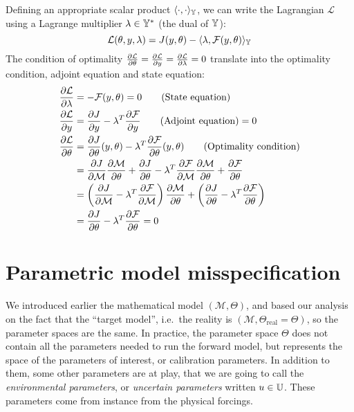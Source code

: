 \documentclass[../../Main_ManuscritThese.tex]{subfiles}
\begin{document}
Defining an appropriate scalar product $\langle \cdot, \cdot \rangle_{\mathbb{Y}}$, we can write the Lagrangian $\mathcal{L}$ using a Lagrange multiplier $\lambda \in \mathbb{Y}^*$ (the dual of $\mathbb{Y}$):
\begin{equation}
  \mathcal{L}(\theta, y, \lambda) = J(y,\theta) - \langle \lambda , \mathcal{F}(y, \theta)\rangle_{\mathbb{Y}}
\end{equation}
The condition of optimality $\frac{\partial \mathcal{L}}{\partial \theta} = \frac{\partial \mathcal{L}}{\partial y} = \frac{\partial \mathcal{L}}{\partial \lambda} = 0$ translate into the optimality condition, adjoint equation and state equation:
\begin{align}
  \frac{\partial \mathcal{L}}{\partial \lambda} &= - \mathcal{F}(y,\theta) = 0 \tag{State equation}\\
  \frac{\partial \mathcal{L}}{\partial y} &= \frac{\partial J}{\partial y} - \lambda^T \frac{\partial \mathcal{F}}{\partial y} \tag{Adjoint equation} = 0 \\
    \frac{\partial \mathcal{L}}{\partial \theta} &= \frac{\partial J}{\partial \theta}(y,\theta) - \lambda^T \frac{\partial \mathcal{F}}{\partial \theta}(y,\theta) \tag{Optimality condition}\\
                               &=\frac{\partial J}{\partial \mathcal{M}}\frac{\partial \mathcal{M}}{\partial \theta}+ \frac{\partial J}{\partial \theta} - \lambda^T \frac{\partial \mathcal{F}}{\partial \mathcal{M}} \frac{\partial \mathcal{M}}{\partial \theta} + \frac{\partial \mathcal{F}}{\partial \theta} \\  
                               &= \left(\frac{\partial J}{\partial \mathcal{M}} - \lambda^T \frac{\partial \mathcal{F}}{\partial \mathcal{M}} \right) \frac{\partial \mathcal{M}}{\partial \theta} + \left( \frac{\partial J}{\partial \theta} - \lambda^T \frac{\partial \mathcal{F}}{\partial \theta} \right) \\
                               &= \frac{\partial J}{\partial \theta} - \lambda^T \frac{\partial \mathcal{F}}{\partial \theta} = 0
\end{align}





\section{Parametric model misspecification}
We introduced earlier the mathematical model $(\mathcal{M},\Theta)$, and based our analysis on the fact that the ``target model'', i.e.\ the reality is $(\mathscr{M},\Theta_{\mathrm{real}} = \Theta)$, so the parameter spaces are the same.
In practice, the parameter space $\Theta$ does not contain all the parameters needed to run the forward model, but represents the space of the parameters of interest, or calibration parameters. In addition to them, some other parameters are at play, that we are going to call the \emph{environmental parameters}, or \emph{uncertain parameters} written $u\in \mathbb{U}$. These parameters come from instance from the physical forcings. 
\end{document}
